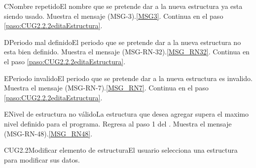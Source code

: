 	\begin{UCtrayectoriaA}{C}{Nombre repetido}{El nombre que se pretende dar a la nueva estructura ya esta siendo usado.}
		\UCpaso Muestra el mensaje (MSG-3).\ref{MSG3}.
		\UCpaso Continua en el paso \ref{paso:CUG2.2.2editaEstructura}.
	\end{UCtrayectoriaA}

	\begin{UCtrayectoriaA}{D}{Periodo mal definido}{El periodo que se pretende dar a la nueva estructura no esta bien definido.}
		\UCpaso Muestra el mensaje (MSG-RN-32).\ref{MSG_RN32}.
		\UCpaso Continua en el paso \ref{paso:CUG2.2.2editaEstructura}.
	\end{UCtrayectoriaA}

	\begin{UCtrayectoriaA}{E}{Periodo invalido}{El periodo que se pretende dar a la nueva estructura es invalido.}
		\UCpaso Muestra el mensaje (MSG-RN-7).\ref{MSG_RN7}.
		\UCpaso Continua en el paso \ref{paso:CUG2.2.2editaEstructura}.
	\end{UCtrayectoriaA}

	\begin{UCtrayectoriaA}{E}{Nivel de estructura no válido}{La estructura que desea agregar supera el maximo nivel definido para el programa.}
		\UCpaso Regresa al paso 1 del .
		\UCpaso Muestra el mensaje (MSG-RN-48).\ref{MSG_RN48}.
	\end{UCtrayectoriaA}

	\begin{UseCase}{CUG2.2}{Modificar elemento de estructura}{El usuario selecciona una estructura para modificar sus datos.}
	\end{UseCase}

